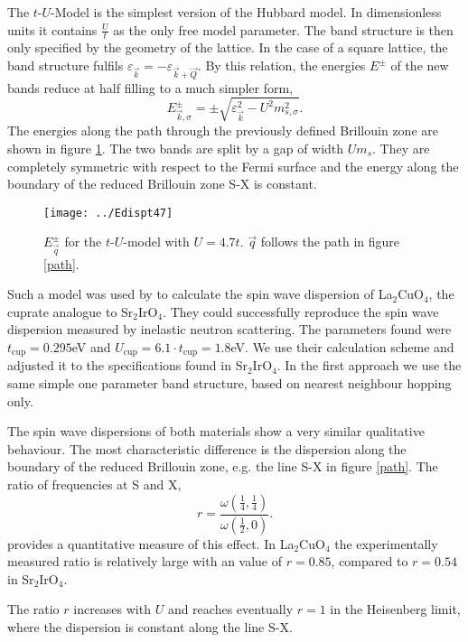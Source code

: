 The $t$-$U$-Model is the simplest version of the Hubbard model.
In dimensionless units it contains $\frac{U}{t}$ as the only free model parameter.
The band structure is then only specified by the geometry of the lattice.
In the case of a square lattice, the band structure fulfils $\varepsilon_{\vec k} = -\varepsilon_{\vec k+\vec Q}$.
By this relation, the energies $E^{\pm}$ of the new bands reduce at half filling to a much simpler form,
\begin{equation}
 E^{\pm}_{\vec k,\sigma} = \pm \sqrt{\varepsilon_{\vec k}^2 -U^2m_{s,\sigma}^2}.
\end{equation}
The energies along the path through the previously defined Brillouin zone are shown in figure \ref{Epmt47}.
The two bands are split by a gap of width $Um_s$. 
They are completely symmetric with respect to the Fermi surface and the energy along the boundary of the reduced Brillouin zone S-X is constant.
%
\begin{figure}
 \centering
 \texttt{[image: ../Edispt47]}
 \caption{$E^{\pm}_{\vec q}$ for the $t$-$U$-model with $U=4.7t$. $\vec q$ follows the path in figure \ref{path}.}
 \label{Epmt47}
\end{figure}


Such a model was used by \citet{PhysRevB.65.132404} to calculate the spin wave dispersion of La$_2$CuO$_4$, the cuprate analogue to Sr$_2$IrO$_4$.
They could successfully reproduce the spin wave dispersion measured by inelastic neutron scattering. 
The parameters found were $t_{\mathrm{cup}}=0.295$eV and $U_{\mathrm{cup}}=6.1\cdot t_{\mathrm{cup}}=1.8$eV. 
We use their calculation scheme and adjusted it to the specifications found in Sr$_2$IrO$_4$.
In the first approach we  use the same simple one parameter band structure, based on nearest neighbour hopping only.

The spin wave dispersions of both materials show a very similar qualitative behaviour.
The most characteristic difference is the dispersion along the boundary of the reduced Brillouin zone, e.g. the line S-X in figure \ref{path}.
The ratio of frequencies at S and X,
\begin{equation} 
r = \frac{ \omega(\frac14,\frac14) }{ \omega(\frac12,0) }. 
\end{equation}
provides a quantitative measure of this effect. 
In  La$_2$CuO$_4$ the experimentally measured ratio is relatively large with an value of $r = 0.85$, compared to $r=0.54$ in
Sr$_2$IrO$_4$.

The ratio $r$ increases with $U$ and reaches eventually $r=1$ 
in the Heisenberg limit, where 
 the dispersion is constant along the line S-X.
 
